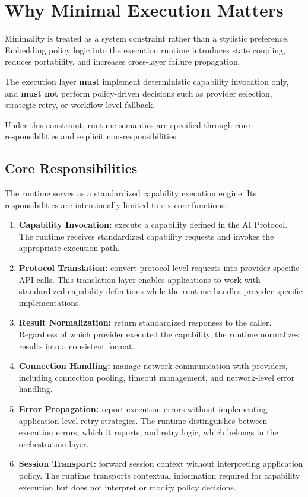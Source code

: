 \section{Why Minimal Execution Matters}
\label{sec:minimal-execution}

Minimality is treated as a system constraint rather than a stylistic preference. Embedding policy logic into the execution runtime introduces state coupling, reduces portability, and increases cross-layer failure propagation.

\begin{definition}
\label{def:minimality-constraint}
The execution layer \textbf{must} implement deterministic capability invocation only, and \textbf{must not} perform policy-driven decisions such as provider selection, strategic retry, or workflow-level fallback.
\end{definition}

Under this constraint, runtime semantics are specified through core responsibilities and explicit non-responsibilities.

\subsection{Core Responsibilities}
\label{subsec:core-responsibilities}

The runtime serves as a standardized capability execution engine. Its responsibilities are intentionally limited to six core functions:

\begin{enumerate}[leftmargin=1.5em]
    \item \textbf{Capability Invocation:} execute a capability defined in the AI Protocol. The runtime receives standardized capability requests and invokes the appropriate execution path.
    \item \textbf{Protocol Translation:} convert protocol-level requests into provider-specific API calls. This translation layer enables applications to work with standardized capability definitions while the runtime handles provider-specific implementations.
    \item \textbf{Result Normalization:} return standardized responses to the caller. Regardless of which provider executed the capability, the runtime normalizes results into a consistent format.
    \item \textbf{Connection Handling:} manage network communication with providers, including connection pooling, timeout management, and network-level error handling.
    \item \textbf{Error Propagation:} report execution errors without implementing application-level retry strategies. The runtime distinguishes between execution errors, which it reports, and retry logic, which belongs in the orchestration layer.
    \item \textbf{Session Transport:} forward session context without interpreting application policy. The runtime transports contextual information required for capability execution but does not interpret or modify policy decisions.
\end{enumerate}

